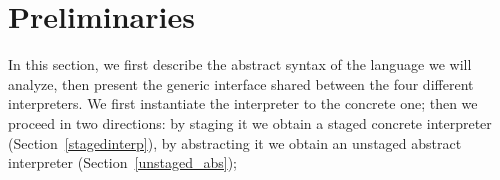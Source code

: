 \newcommand{\TLang}{$L_\lambda$}

\section{Preliminaries}

In this section, we first describe the abstract syntax of the language we will
analyze, then present the generic interface shared between the four different
interpreters. We first instantiate the interpreter to the concrete one; then we
proceed in two directions: by staging it we obtain a staged concrete interpreter
(Section~\ref{stagedinterp}), by abstracting it we obtain an unstaged abstract
interpreter (Section~\ref{unstaged_abs});




